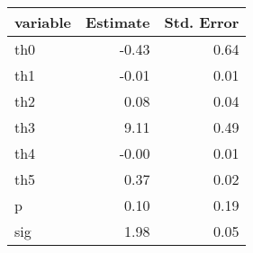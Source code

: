 \begin{tabular}{lrr}
  \hline
variable & Estimate & Std. Error \\ 
  \hline
th0 & -0.43 & 0.64 \\ 
  th1 & -0.01 & 0.01 \\ 
  th2 & 0.08 & 0.04 \\ 
  th3 & 9.11 & 0.49 \\ 
  th4 & -0.00 & 0.01 \\ 
  th5 & 0.37 & 0.02 \\ 
  p & 0.10 & 0.19 \\ 
  sig & 1.98 & 0.05 \\ 
   \hline
\end{tabular}
